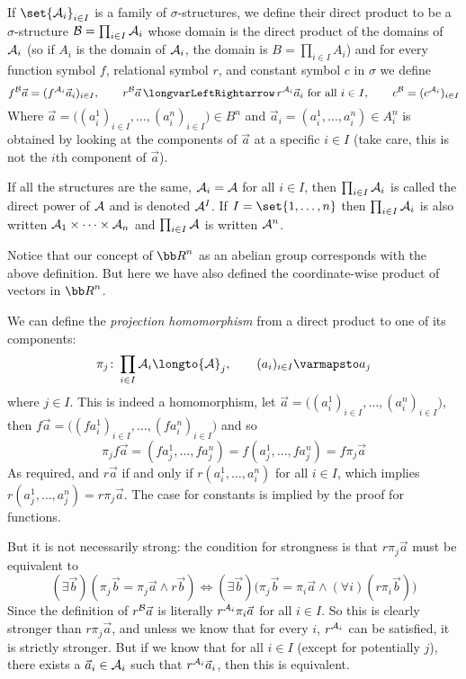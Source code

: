     If $\set{{\cal A}_i}_{i\in I}$ is a family of $\sigma$-structures, we define their {\emphcolor direct product} to be a $\sigma$-structure ${\cal B}=\prod_{i\in I}{\cal A}_i$ whose domain is the direct
    product of the domains of ${\cal A}_i$ (so if $A_i$ is the domain of ${\cal A}_i$, the domain is $B=\prod_{i\in I}A_i$) and for every function symbol $f$, relational symbol $r$, and constant symbol $c$
    in $\sigma$ we define
    $$ f^{\cal B}\vec a = (f^{{\cal A}_i}\vec a_i)_{i\in I},\qquad r^{\cal B}\vec a \iff r^{{\cal A}_i}\vec a_i\hbox{ for all $i\in I$},\qquad c^{\cal B}=(c^{{\cal A}_i})_{i\in I} $$
    Where $\vec a=\bigl((a^1_i)_{i\in I},\dots,(a^n_i)_{i\in I}\bigr)\in B^n$ and $\vec a_i=(a^1_i,\dots,a^n_i)\in A_i^n$ is obtained by looking at the components of $\vec a$ at a specific $i\in I$ (take
    care, this is not the $i$th component of $\vec a$).

    If all the structures are the same, ${\cal A}_i={\cal A}$ for all $i\in I$, then $\prod_{i\in I}{\cal A}_i$ is called the {\emphcolor direct power}%
     of ${\cal A}$ and is denoted ${\cal A}^I$.
    If $I=\set{1,\dots,n}$ then $\prod_{i\in I}{\cal A}_i$ is also written ${\cal A}_1\times\cdots\times{\cal A}_n$ and $\prod_{i\in I}{\cal A}$ is written ${\cal A}^n$.

\edefn

Notice that our concept of ${\bb R}^n$ as an abelian group corresponds with the above definition.
But here we have also defined the coordinate-wise product of vectors in ${\bb R}^n$.

We can define the {\it projection homomorphism} from a direct product to one of its components:
$$ \pi_j\colon\prod_{i\in I}{\cal A}_i\longto{\cal A}_j,\qquad (a_i)_{i\in I}\varmapsto a_j $$
where $j\in I$.
This is indeed a homomorphism, let $\vec a=\bigl((a^1_i)_{i\in I},\dots,(a^n_i)_{i\in I}\bigr)$, then $f\vec a=\bigl((fa^1_i)_{i\in I},\dots,(fa^n_i)_{i\in I}\bigr)$ and so
$$ \pi_jf\vec a = (fa^1_j,\dots,fa^n_j) = f(a^1_j,\dots,fa^n_j) = f\pi_j\vec a $$
As required, and $r\vec a$ if and only if $r(a^1_i,\dots,a^n_i)$ for all $i\in I$, which implies $r(a^1_j,\dots,a^n_j)=r\pi_j\vec a$.
The case for constants is implied by the proof for functions.

But it is not necessarily strong: the condition for strongness is that $r\pi_j\vec a$ must be equivalent to
$$ (\exists\vec b)(\pi_j\vec b=\pi_j\vec a\land r\vec b) \iff (\exists\vec b)\bigl(\pi_j\vec b=\pi_i\vec a\land(\forall i)(r\pi_i\vec b)\bigr) $$
Since the definition of $r^{\cal B}\vec a$ is literally $r^{{\cal A}_i}\pi_i\vec a$ for all $i\in I$.
So this is clearly stronger than $r\pi_j\vec a$, and unless we know that for every $i$, $r^{{\cal A}_i}$ can be satisfied, it is strictly stronger.
But if we know that for all $i\in I$ (except for potentially $j$), there exists a $\vec a_i\in{\cal A}_i$ such that $r^{{\cal A}_i}\vec a_i$, then this is equivalent.

